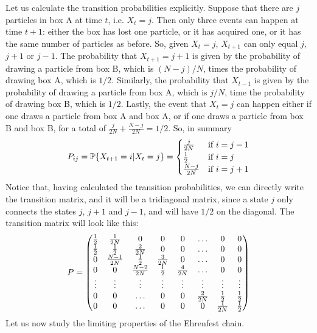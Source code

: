 Let us calculate the transition probabilities explicitly. Suppose that there are $j$ particles in box A at time $t$, i.e. $X_t = j$. Then only three events can happen at time $t+1$: either the box has lost one particle, or it has acquired one, or it has the same number of particles as before. So, given $X_t = j$, $X_{t+1}$ can only equal $j$, $j+1$ or $j-1$. The probability that $X_{t+1} = j+1$ is given by the probability of drawing a particle from box B, which is $(N-j)/N$, times the probability of drawing box A, which is $1/2$. Similarly, the probability that $X_{t-1}$ is given by the probability of drawing a particle from box A, which is $j/N$, time the probability of drawing box B, which is $1/2$. Lastly, the event that $X_t = j$ can happen either if one draws a particle from box A and box A, or if one draws a particle from box B and box B, for a total of $\frac{j}{2N} + \frac{N-j}{2N} = 1/2$. So, in summary
\begin{equation}
    P_{ij} = \mathbb{P}\{X_{t+1} = i | X_t = j\} =
    \begin{cases}
        \frac{j}{2N} & \text{if $i = j - 1$} \\
        \frac{1}{2} & \text{if $i = j$}\\
        \frac{N - j}{2N} & \text{if $i = j + 1$} \\
    \end{cases}
\end{equation}
Notice that, having calculated the transition probabilities, we can directly write the transition matrix, and it will be a tridiagonal matrix, since a state $j$ only connects the states $j$, $j+1$ and $j-1$, and will have $1/2$ on the diagonal. The transition matrix will look like this:
\begin{equation}
    P = 
    \begin{pmatrix}
        \frac{1}{2} & \frac{1}{2N} & 0 & 0 & 0 & \dots & 0 & 0 \\
        \frac{1}{2} & \frac{1}{2} & \frac{2}{2N} & 0 & 0 & \dots & 0 & 0 \\
        0     & \frac{N-1}{2N} & \frac{1}{2} & \frac{3}{2N} & 0 & \dots & 0 & 0 \\
        0 & 0 & \frac{N-2}{2N} & \frac{1}{2} & \frac{4}{2N} & \dots & 0 & 0 \\
        \vdots & \vdots & \vdots & \vdots & \vdots & \vdots & \vdots & \vdots \\
        0 & 0 & \dots & 0 & 0 & \frac{2}{2N} & \frac{1}{2} & \frac{1}{2} \\
        0 & 0 & \dots & 0 & 0 & 0 &  \frac{1}{2N} & \frac{1}{2}
    \end{pmatrix}
\end{equation}
Let us now study the limiting properties of the Ehrenfest chain.